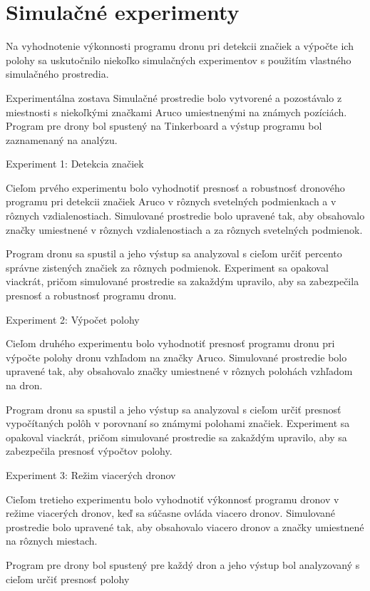 \section{Simulačné experimenty}
Na vyhodnotenie výkonnosti programu dronu pri detekcii značiek a výpočte ich polohy sa uskutočnilo niekoľko simulačných experimentov s použitím vlastného simulačného prostredia.

Experimentálna zostava
Simulačné prostredie bolo vytvorené a pozostávalo z miestnosti s niekoľkými značkami Aruco umiestnenými na známych pozíciách. Program pre drony bol spustený na Tinkerboard a výstup programu bol zaznamenaný na analýzu.

Experiment 1: Detekcia značiek

Cieľom prvého experimentu bolo vyhodnotiť presnosť a robustnosť dronového programu pri detekcii značiek Aruco v rôznych svetelných podmienkach a v rôznych vzdialenostiach. Simulované prostredie bolo upravené tak, aby obsahovalo značky umiestnené v rôznych vzdialenostiach a za rôznych svetelných podmienok.

Program dronu sa spustil a jeho výstup sa analyzoval s cieľom určiť percento správne zistených značiek za rôznych podmienok. Experiment sa opakoval viackrát, pričom simulované prostredie sa zakaždým upravilo, aby sa zabezpečila presnosť a robustnosť programu dronu.

Experiment 2: Výpočet polohy

Cieľom druhého experimentu bolo vyhodnotiť presnosť programu dronu pri výpočte polohy dronu vzhľadom na značky Aruco. Simulované prostredie bolo upravené tak, aby obsahovalo značky umiestnené v rôznych polohách vzhľadom na dron.

Program dronu sa spustil a jeho výstup sa analyzoval s cieľom určiť presnosť vypočítaných polôh v porovnaní so známymi polohami značiek. Experiment sa opakoval viackrát, pričom simulované prostredie sa zakaždým upravilo, aby sa zabezpečila presnosť výpočtov polohy.

Experiment 3: Režim viacerých dronov

Cieľom tretieho experimentu bolo vyhodnotiť výkonnosť programu dronov v režime viacerých dronov, keď sa súčasne ovláda viacero dronov. Simulované prostredie bolo upravené tak, aby obsahovalo viacero dronov a značky umiestnené na rôznych miestach.

Program pre drony bol spustený pre každý dron a jeho výstup bol analyzovaný s cieľom určiť presnosť polohy


